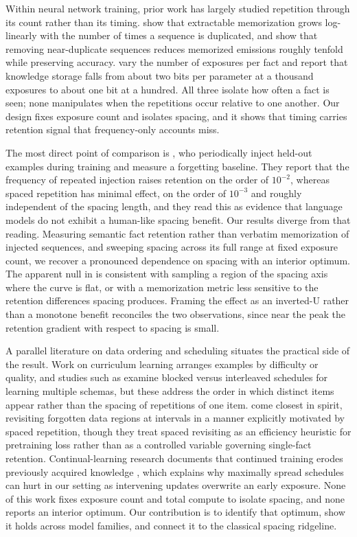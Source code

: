\documentclass[10pt]{article}
\begin{document}
Within neural network training, prior work has largely studied repetition through its count rather
than its timing. \citet{carlini2022quantifying} show that extractable memorization grows
log-linearly with the number of times a sequence is duplicated, and \citet{lee2022deduplicating}
show that removing near-duplicate sequences reduces memorized emissions roughly tenfold while
preserving accuracy. \citet{allenzhu2024capacity} vary the number of exposures per fact and report
that knowledge storage falls from about two bits per parameter at a thousand exposures to about one
bit at a hundred. All three isolate how often a fact is seen; none manipulates when the repetitions
occur relative to one another. Our design fixes exposure count and isolates spacing, and it shows
that timing carries retention signal that frequency-only accounts miss.

The most direct point of comparison is \citet{tirumala2022memorization}, who periodically inject
held-out examples during training and measure a forgetting baseline. They report that the frequency
of repeated injection raises retention on the order of $10^{-2}$, whereas spaced repetition has
minimal effect, on the order of $10^{-3}$ and roughly independent of the spacing length, and they
read this as evidence that language models do not exhibit a human-like spacing benefit. Our results
diverge from that reading. Measuring semantic fact retention rather than verbatim memorization of
injected sequences, and sweeping spacing across its full range at fixed exposure count, we recover
a pronounced dependence on spacing with an interior optimum. The apparent null in
\citet{tirumala2022memorization} is consistent with sampling a region of the spacing axis where the
curve is flat, or with a memorization metric less sensitive to the retention differences spacing
produces. Framing the effect as an inverted-U rather than a monotone benefit reconciles the two
observations, since near the peak the retention gradient with respect to spacing is small.

A parallel literature on data ordering and scheduling situates the practical side of the result.
Work on curriculum learning arranges examples by difficulty or quality, and studies such as
\citet{beukers2024blocked} examine blocked versus interleaved schedules for learning multiple
schemas, but these address the order in which distinct items appear rather than the spacing of
repetitions of one item. \citet{prakriya2024lfr} come closest in spirit, revisiting forgotten data
regions at intervals in a manner explicitly motivated by spaced repetition, though they treat
spaced revisiting as an efficiency heuristic for pretraining loss rather than as a controlled
variable governing single-fact retention. Continual-learning research documents that continued
training erodes previously acquired knowledge \citep{luo2023empirical}, which explains why
maximally spread schedules can hurt in our setting as intervening updates overwrite an early
exposure. None of this work fixes exposure count and total compute to isolate spacing, and none
reports an interior optimum. Our contribution is to identify that optimum, show it holds across
model families, and connect it to the classical spacing ridgeline.
\end{document}
